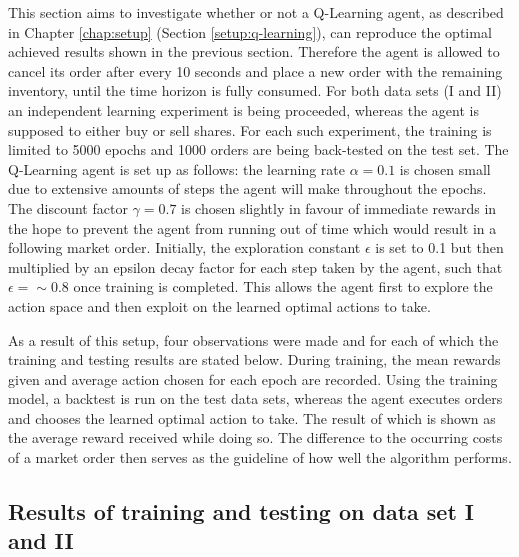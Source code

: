 This section aims to investigate whether or not a Q-Learning agent, as described in Chapter \ref{chap:setup} (Section \ref{setup:q-learning}), can reproduce the optimal achieved results shown in the previous section.
Therefore the agent is allowed to cancel its order after every 10 seconds and place a new order with the remaining inventory, until the time horizon is fully consumed.
For both data sets (I and II) an independent learning experiment is being proceeded, whereas the agent is supposed to either buy or sell shares.
For each such experiment, the training is limited to 5000 epochs and 1000 orders are being back-tested on the test set.
The Q-Learning agent is set up as follows:
the learning rate $\alpha=0.1$ is chosen small due to extensive amounts of steps the agent will make throughout the epochs.
The discount factor $\gamma=0.7$ is chosen slightly in favour of immediate rewards in the hope to prevent the agent from running out of time which would result in a following market order.
Initially, the exploration constant $\epsilon$ is set to 0.1 but then multiplied by an epsilon decay factor for each step taken by the agent, such that $\epsilon=\sim0.8$ once training is completed.
This allows the agent first to explore the action space and then exploit on the learned optimal actions to take.

As a result of this setup, four observations were made and for each of which the training and testing results are stated below.
During training, the mean rewards given and average action chosen for each epoch are recorded.
Using the training model, a backtest is run on the test data sets, whereas the agent executes orders and chooses the learned optimal action to take.
The result of which is shown as the average reward received while doing so.
The difference to the occurring costs of a market order then serves as the guideline of how well the algorithm performs.
\vfill
\newpage

\subsection{Results of training and testing on data set I and II}

